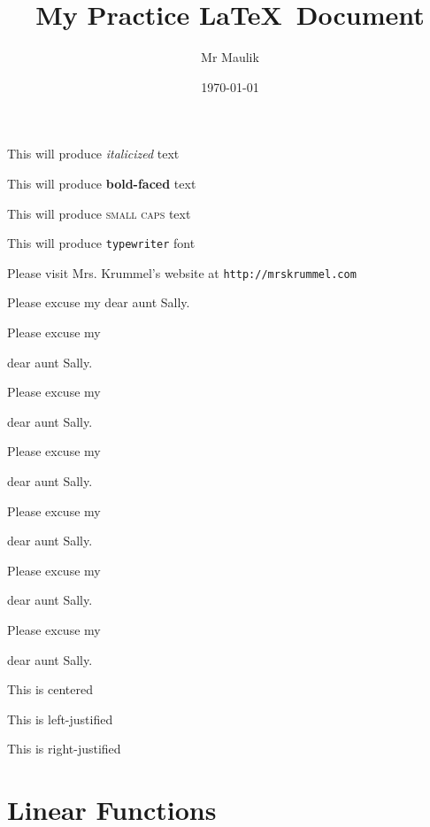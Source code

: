 \documentclass[11pt]{article}
\begin{document}
\tableofcontents

\title{My Practice \LaTeX \ Document}
\author{Mr Maulik}
\date{\today}
\maketitle

This will produce \textit{italicized} text

This will produce \textbf{bold-faced} text

This will produce \textsc{small caps} text

This will produce \texttt{typewriter} font

Please visit Mrs. Krummel's website at \texttt{http://mrskrummel.com} 

Please excuse my  dear aunt Sally.


Please excuse my  \begin{large} dear aunt Sally. \end{large}

Please excuse my  \begin{Large} dear aunt Sally. \end{Large}

Please excuse my  \begin{huge} dear aunt Sally. \end{huge}

Please excuse my  \begin{Huge} dear aunt Sally. \end{Huge}

Please excuse my  \begin{small} dear aunt Sally. \end{small}

Please excuse my  \begin{tiny} dear aunt Sally. \end{tiny}

\begin{center} This is centered \end{center}

\begin{flushleft} This is left-justified \end{flushleft}

\begin{flushright} This is right-justified \end{flushright}

\section{Linear Functions}
\end{document}
